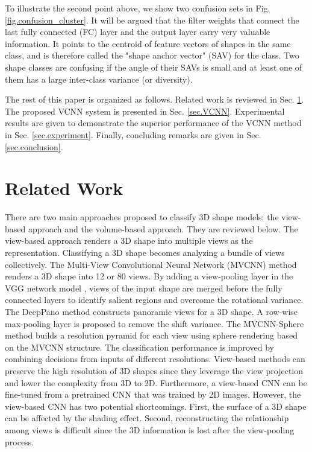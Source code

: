 \documentclass[preprint,12pt]{elsarticle}
\begin{document}
To illustrate the second point above, we show two confusion sets in Fig.
\ref{fig.confusion_cluster}.  It will be argued that the filter weights
that connect the last fully connected (FC) layer and the output layer
carry very valuable information. It points to the centroid of feature
vectors of shapes in the same class, and is therefore called the "shape
anchor vector" (SAV) for the class. Two shape classes are confusing if
the angle of their SAVs is small and at least one of them has a large
inter-class variance (or diversity). 

The rest of this paper is organized as follows. Related work is reviewed
in Sec. \ref{sec.relateWork}. The proposed VCNN system is presented in
Sec. \ref{sec.VCNN}.  Experimental results are given to demonstrate the
superior performance of the VCNN method in Sec. \ref{sec.experiment}.
Finally, concluding remarks are given in Sec. \ref{sec.conclusion}. 

\section{Related Work}\label{sec.relateWork}

There are two main approaches proposed to classify 3D shape models: the
view-based approach and the volume-based approach. They are reviewed
below.  The view-based approach renders a 3D shape into multiple views
as the representation. Classifying a 3D shape becomes analyzing a bundle
of views collectively. The Multi-View Convolutional Neural Network
(MVCNN) \cite{su2015multi} method renders a 3D shape into 12 or 80
views. By adding a view-pooling layer in the VGG network model
\cite{Simonyan14c}, views of the input shape are merged before the fully
connected layers to identify salient regions and overcome the
rotational variance. The DeepPano \cite{shi2015deeppano} method
constructs panoramic views for a 3D shape. A row-wise max-pooling layer
is proposed to remove the shift variance. The MVCNN-Sphere method
\cite{qi2016volumetric} builds a resolution pyramid for each view using
sphere rendering based on the MVCNN structure. The classification
performance is improved by combining decisions from inputs of different
resolutions.  View-based methods can preserve the high resolution of 3D
shapes since they leverage the view projection and lower the complexity
from 3D to 2D. Furthermore, a view-based CNN can be fine-tuned from a
pretrained CNN that was trained by 2D images.  However, the view-based
CNN has two potential shortcomings. First, the surface of a 3D shape can
be affected by the shading effect.  Second, reconstructing the
relationship among views is difficult since the 3D information is lost
after the view-pooling process. 
\end{document}

